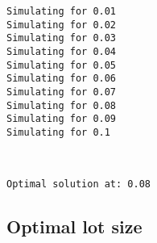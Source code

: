 \documentclass[11pt]{article}
\begin{document}
    \begin{Verbatim}[commandchars=\\\{\}]
Simulating for 0.01
Simulating for 0.02
Simulating for 0.03
Simulating for 0.04
Simulating for 0.05
Simulating for 0.06
Simulating for 0.07
Simulating for 0.08
Simulating for 0.09
Simulating for 0.1

    \end{Verbatim}

    \begin{center}
    \end{center}
    { \hspace*{\fill} \\}
    
    \begin{Verbatim}[commandchars=\\\{\}]
Optimal solution at: 0.08

    \end{Verbatim}

    \hypertarget{optimal-lot-size}{%
\subsection{Optimal lot size}\label{optimal-lot-size}}
\end{document}
